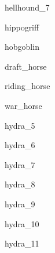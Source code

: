 \documentclass[a4paper,serif]{module}
\begin{document}
\begin{newmonster}{hellhound_7}\end{newmonster}

\begin{newmonster}{hippogriff}\end{newmonster}

\begin{newmonster}{hobgoblin}\end{newmonster}


\begin{newmonster}{draft_horse}\end{newmonster}

\begin{newmonster}{riding_horse}\end{newmonster}

\begin{newmonster}{war_horse}\end{newmonster}


\begin{newmonster}{hydra_5}\end{newmonster}

\begin{newmonster}{hydra_6}\end{newmonster}

\begin{newmonster}{hydra_7}\end{newmonster}

\begin{newmonster}{hydra_8}\end{newmonster}

\begin{newmonster}{hydra_9}\end{newmonster}

\begin{newmonster}{hydra_10}\end{newmonster}

\begin{newmonster}{hydra_11}\end{newmonster}
\end{document}
